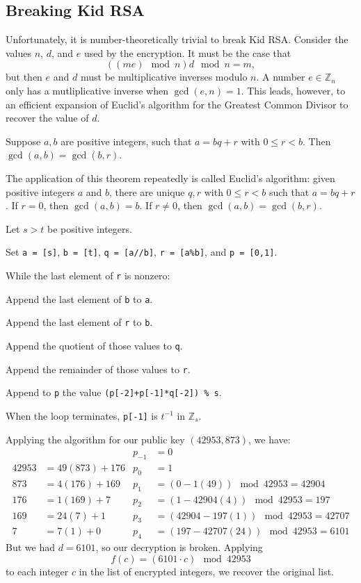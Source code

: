 \documentclass[m3380-lec-main.tex]{subfiles}
\begin{document}
\subsection{Breaking Kid RSA}
Unfortunately, it is number-theoretically trivial to break Kid RSA. Consider the values $n$, $d$, and $e$ used by the encryption. It must be the case that \[((me)\mod n)d\mod n = m,\]
but then $e$ and $d$ must be multiplicative inverses modulo $n$. A number $e\in \mathbb{Z}_n$ only has a mutliplicative inverse when $\gcd(e,n)=1$. This leads, however, to an efficient expansion of Euclid's algorithm for the Greatest Common Divisor to recover the value of $d$.
\begin{thm} Suppose $a,b$ are positive integers, such that $a=bq+r$ with $0\leq r<b$. Then $\gcd(a,b) = \gcd(b,r)$.
\end{thm}
The application of this theorem repeatedly is called Euclid's algorithm: given positive integers $a$ and $b$, there are unique $q,r$ with $0\leq r<b$ such that $a=bq+r$. If $r=0$, then $\gcd(a,b)=b$. If $r\neq 0$, then $\gcd(a,b) = \gcd(b,r)$.

\begin{alg}
Let $s>t$ be positive integers.
\begin{enum}
\item Set \verb|a = [s]|, \verb|b = [t]|, \verb|q = [a//b]|, \verb|r = [a%b]|, and \verb|p = [0,1]|.
\item While the last element of \verb|r| is nonzero:
\begin{enuma}
\item Append the last element of \verb|b| to \verb|a|.
\item Append the last element of \verb|r| to \verb|b|.
\item Append the quotient of those values to \verb|q|.
\item Append the remainder of those values to \verb|r|.
\item Append to \verb|p| the value \verb|(p[-2]+p[-1]*q[-2]) % s|.
\end{enuma}
\item When the loop terminates, \verb|p[-1]| is $t^{-1}$ in $\mathbb{Z}_s$.
\end{enum}
\end{alg}

\begin{exmp}
Applying the algorithm for our public key $(42953,873)$, we have:
\begin{align*}
&&  p_{-1} &= 0 \\
42953 &= 49(873)+176 & p_0 &= 1 \\
873 &= 4(176)+169    & p_1 &= (0-1(49))\mod 42953 = 42904 \\
176 &= 1(169)+7      & p_2 &= (1-42904(4))\mod 42953 = 197 \\
169 &= 24(7)+1       & p_3 &= (42904-197(1))\mod 42953 = 42707 \\
7 &= 7(1)+0          & p_4 &= (197-42707(24))\mod 42953 = 6101
\end{align*}
But we had $d=6101$, so our decryption is broken. Applying \[f(c) = (6101\cdot c)\mod 42953\] to each integer $c$ in the list of encrypted integers, we recover the original list.
\end{exmp}
\end{document}
